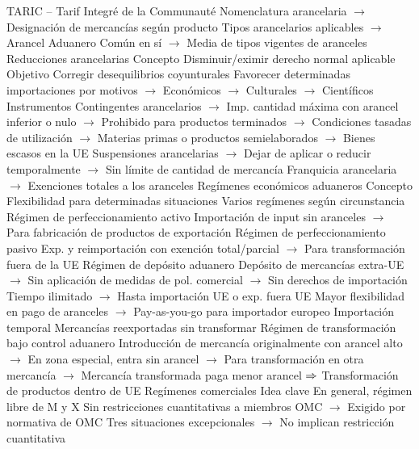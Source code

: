 \documentclass{nuevotema}
\begin{document}
\begin{esquemal}
				\4 TARIC -- Tarif Integré de la Communauté
				\4[] Nomenclatura arancelaria
				\4[] $\to$ Designación de mercancías según producto
				\4[] Tipos arancelarios aplicables
				\4[] $\to$ Arancel Aduanero Común en sí
				\4[] $\to$ Media de tipos vigentes de aranceles
			\3 Reducciones arancelarias
				\4 Concepto
				\4[] Disminuir/eximir derecho normal aplicable
				\4 Objetivo
				\4[] Corregir desequilibrios coyunturales
				\4[] Favorecer determinadas importaciones por motivos
				\4[] $\to$ Económicos
				\4[] $\to$ Culturales
				\4[] $\to$ Científicos
				\4 Instrumentos
				\4[] Contingentes arancelarios
				\4[] $\to$ Imp. cantidad máxima con arancel inferior o nulo
				\4[] $\to$ Prohibido para productos terminados
				\4[] $\to$ Condiciones tasadas de utilización
				\4[] $\to$ Materias primas o productos semielaborados
				\4[] $\to$ Bienes escasos en la UE
				\4[] Suspensiones arancelarias
				\4[] $\to$ Dejar de aplicar o reducir temporalmente
				\4[] $\to$ Sin límite de cantidad de mercancía
				\4[] Franquicia arancelaria
				\4[] $\to$ Exenciones totales a los aranceles
			\3 Regímenes económicos aduaneros
				\4 Concepto
				\4[] Flexibilidad para determinadas situaciones
				\4[] Varios regímenes según circunstancia
				\4[i] Régimen de perfeccionamiento activo
				\4[] Importación de input sin aranceles
				\4[] $\to$ Para fabricación de productos de exportación
				\4[ii] Régimen de perfeccionamiento pasivo
				\4[] Exp. y reimportación con exención total/parcial
				\4[] $\to$ Para transformación fuera de la UE
				\4[iii] Régimen de depósito aduanero
				\4[] Depósito de mercancías extra-UE
				\4[] $\to$ Sin aplicación de medidas de pol. comercial
				\4[] $\to$ Sin derechos de importación
				\4[] Tiempo ilimitado
				\4[] $\to$ Hasta importación UE o exp. fuera UE
				\4[] Mayor flexibilidad en pago de aranceles
				\4[] $\to$ Pay-as-you-go para importador europeo
				\4[iv] Importación temporal
				\4[] Mercancías reexportadas sin transformar
				\4[v] Régimen de transformación bajo control aduanero
				\4[] Introducción de mercancía originalmente con arancel alto
				\4[] $\to$ En zona especial, entra sin arancel
				\4[] $\to$ Para transformación en otra mercancía
				\4[] $\to$ Mercancía transformada paga menor arancel
				\4[] $\Rightarrow$ Transformación de productos dentro de UE
		\2 Regímenes comerciales
			\3 Idea clave
				\4 En general, régimen libre de M y X
				\4 Sin restricciones cuantitativas a miembros OMC
				\4[] $\to$ Exigido por normativa de OMC
				\4 Tres situaciones excepcionales
				\4[] $\to$ No implican restricción cuantitativa

\end{esquemal}
\end{document}

